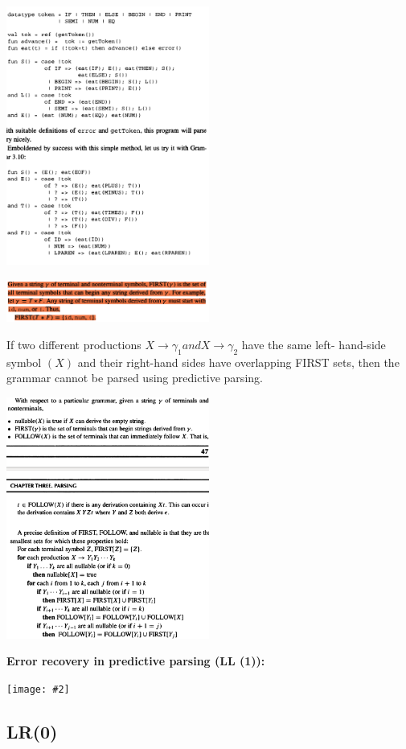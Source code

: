 \documentclass[8pt, a4paper, oneside, twocolumn]{extarticle}
\newcommand{\iph}[2]{
    \texttt{[image: \#2]}
}
\begin{document}
\includegraphics[width=0.5\textwidth,height=0.5\textheight,keepaspectratio]{pp2}

\includegraphics[width=0.5\textwidth,height=0.5\textheight,keepaspectratio]{first}

If two different productions $X \rightarrow \gamma_1 and X \rightarrow \gamma_2$ have the same left-
hand-side symbol $(X)$ and their right-hand sides have overlapping FIRST
sets, then the grammar cannot be parsed using predictive parsing.

\includegraphics[width=0.5\textwidth,height=0.5\textheight,keepaspectratio]{follow}

\textbf{Error recovery in predictive parsing (LL (1)):}

\iph{0.5}{erpp}

\subsection{LR(0)}
\end{document}
